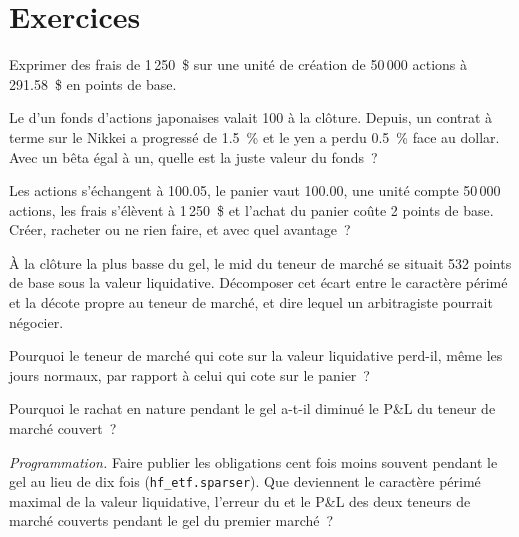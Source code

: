 \section{Exercices}

\begin{exercise}[$\star$]\label{exo:hf:etf-market-making:1}
Exprimer des frais de 1\,250~\$ sur une unité de création de 50\,000 actions à 291.58~\$ en points de base.
\end{exercise}

\begin{exercise}[$\star$]\label{exo:hf:etf-market-making:2}
Le  d'un fonds d'actions japonaises valait 100 à la clôture. Depuis, un contrat à terme sur le Nikkei a progressé de 1.5~\% et le yen a perdu 0.5~\% face au
dollar. Avec un bêta égal à un, quelle est la juste valeur du fonds~?
\end{exercise}

\begin{exercise}[$\star$]\label{exo:hf:etf-market-making:3}
Les actions s'échangent à 100.05, le panier vaut 100.00, une unité compte 50\,000 actions, les frais s'élèvent à 1\,250~\$ et l'achat du panier coûte 2 points de base. Créer,
racheter ou ne rien faire, et avec quel avantage~?
\end{exercise}

\begin{exercise}[$\star\star$]\label{exo:hf:etf-market-making:4}
À la clôture la plus basse du gel, le mid du teneur de marché se situait 532 points de base sous la valeur liquidative. Décomposer cet écart entre le caractère périmé et la
décote propre au teneur de marché, et dire lequel un arbitragiste pourrait négocier.
\end{exercise}

\begin{exercise}[$\star\star$]\label{exo:hf:etf-market-making:5}
Pourquoi le teneur de marché qui cote sur la valeur liquidative perd-il, même les jours normaux, par rapport à celui qui cote sur le panier~?
\end{exercise}

\begin{exercise}[$\star\star$]\label{exo:hf:etf-market-making:6}
Pourquoi le rachat en nature pendant le gel a-t-il diminué le P\&L du teneur de marché couvert~?
\end{exercise}

\begin{exercise}[$\star\star\star$]\label{exo:hf:etf-market-making:7}
\emph{Programmation.} Faire publier les obligations cent fois moins souvent pendant le gel au lieu de dix fois (\texttt{hf\_etf.sparser}). Que deviennent le caractère périmé maximal de la
valeur liquidative, l'erreur du  et le P\&L des deux teneurs de marché couverts pendant le gel du premier marché~?
\end{exercise}

